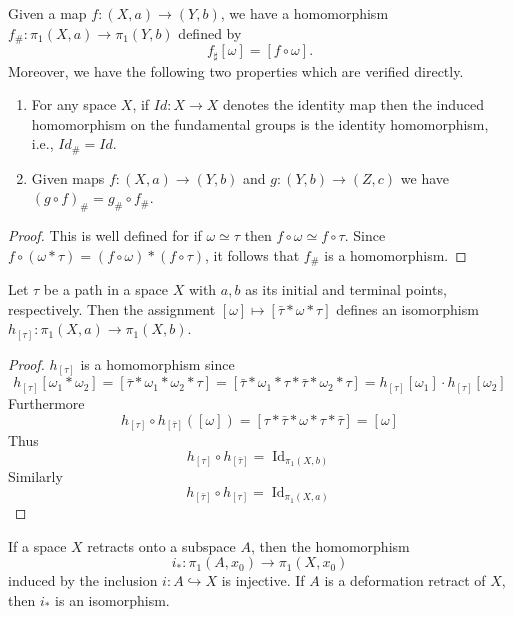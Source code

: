 \documentclass[../main.tex]{subfiles}
\begin{document}
\begin{definition}{}{}
    Given a map $f:(X,a)\longrightarrow(Y,b)$, we have a homomorphism $f_{\#}:\pi_{1}(X,a)\longrightarrow\pi_{1}(Y,b)$ defined by
\begin{equation}
f_{\sharp }[\omega]=[f\circ\omega].
\end{equation} Moreover, we have the following two properties which are verified directly.
\begin{enumerate}
\item For any space $X$, if $Id:X\longrightarrow X$ denotes the identity map then the induced homomorphism on the fundamental groups is the identity homomorphism, i.e., $Id_{\#}=Id$.
\item Given maps $f:(X,a)\longrightarrow(Y,b)$ and $g:(Y,b)\longrightarrow(Z,c)$ we have $(g\circ f)_{\#}=g_{\#}\circ f_{\#}$.
\end{enumerate}
\end{definition}

\begin{proof}
    
This is well defined for if $\omega\simeq\tau$ then $f\circ\omega\simeq f\circ\tau$. Since $f\circ(\omega*\tau)=(f\circ\omega)*(f\circ\tau)$, it follows that $f_{\#}$ is a homomorphism.
\end{proof}



\begin{theorem}{}{}
Let $\tau$ be a path in a space $X$ with $a,b$ as its initial and terminal points, respectively. Then the assignment $[\omega] \mapsto [\bar{\tau} * \omega * \tau]$ defines an isomorphism $h_{[\tau]}: \pi_1(X, a) \rightarrow \pi_1(X,b)$.
\end{theorem}

\begin{proof}
    \(  h_{[\tau ]}  \) is a homomorphism since \[
    h_{[\tau ]}[ \omega _1 * \omega _2 ]= [\bar{\tau}* \omega_1* \omega _2 *\tau ]= [\bar{\tau}* \omega _1 *\tau *\bar{\tau}* \omega _2 *\tau ]= h_{[\tau ]}[ \omega _1 ] \cdot  h_{[\tau ]}[ \omega _2 ]
    \] Furthermore
     \[
     h_{[\tau ]}\circ h_{[\bar{\tau} ]}\left( [ \omega ] \right) = [\tau *\bar{\tau}*  \omega * \tau  *\bar{\tau}]= [ \omega ]
     \]Thus \[
     h_{[\tau ]}\circ h_{[\bar{\tau}]}= \operatorname{Id}_{ \pi _1 \left( X,b \right) }
     \] Similarly \[
     h_{[\bar{\tau}]}\circ h_{[\tau ]}= \operatorname{Id}_{ \pi _1 \left( X,a \right) }
     \]
\end{proof}
\begin{proposition}{}{}
If a space \(X\) retracts onto a subspace \(A\), then the homomorphism
\[
i_{*}:\pi_{1}(A,x_{0})\to\pi_{1}(X,x_{0})
\]
induced by the inclusion \(i:A\hookrightarrow X\) is injective. If \(A\) is a deformation retract of \(X\), then \(i_{*}\) is an isomorphism.
\end{proposition}
\end{document}
